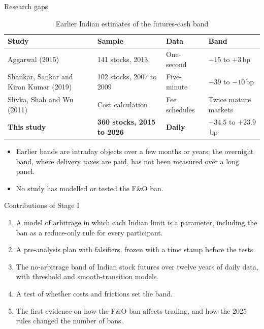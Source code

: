 \documentclass[11pt]{beamer}
\newcommand{\bp}{\,bp}
\begin{document}
\begin{frame}{Research gaps}
  \begin{table}
    \scriptsize
    \caption{Earlier Indian estimates of the futures-cash band}
    \begin{tabular}{@{}p{3.1cm}p{2.5cm}p{2.0cm}p{2.6cm}@{}}
      \toprule
      Study & Sample & Data & Band \\
      \midrule
      Aggarwal (2015) & 141 stocks, 2013 & One-second & $-15$ to $+3$\bp \\
      Shankar, Sankar and Kiran Kumar (2019) & 102 stocks, 2007 to 2009 & Five-minute & $-39$ to $-10$\bp \\
      Slivka, Shah and Wu (2011) & Cost calculation & Fee schedules & Twice mature markets \\
      \textbf{This study} & \textbf{360 stocks, 2015 to 2026} & \textbf{Daily} & $\mathbf{-34.5}$ to $\mathbf{+23.9}$\bp \\
      \bottomrule
    \end{tabular}
  \end{table}
  \begin{itemize}
    \small
    \item Earlier bands are intraday objects over a few months or years; the overnight band, where delivery taxes are
    paid, has not been measured over a long panel.
    \item No study has modelled or tested the F\&O ban.
  \end{itemize}
\end{frame}

\begin{frame}{Contributions of Stage I}
  \begin{enumerate}
    \item A model of arbitrage in which each Indian limit is a parameter, including the ban as a reduce-only rule for
    every participant.
    \item A pre-analysis plan with falsifiers, frozen with a time stamp before the tests.
    \item The no-arbitrage band of Indian stock futures over twelve years of daily data, with threshold and
    smooth-transition models.
    \item A test of whether costs and frictions set the band.
    \item The first evidence on how the F\&O ban affects trading, and how the 2025 rules changed the number of bans.
  \end{enumerate}
\end{frame}
\end{document}
